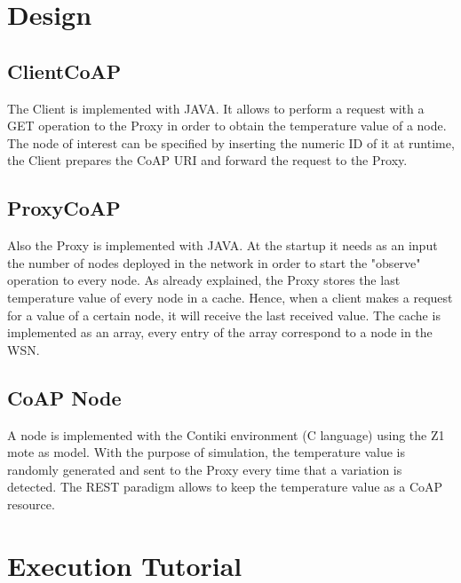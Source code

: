 \documentclass[10pt,english, openany]{book}
\begin{document}
\chapter{Design}
\section{ClientCoAP}
The Client is implemented with JAVA. It allows to perform a request with a GET operation to the Proxy in order to obtain the temperature value of a node. The node of interest can be specified by inserting the numeric ID of it at runtime, the Client prepares the CoAP URI and forward the request to the Proxy.

\section{ProxyCoAP}
Also the Proxy is implemented with JAVA. At the startup it needs as an input the number of nodes deployed in the network in order to start the "observe" operation to every node. 
As already explained, the Proxy stores the last temperature value of every node in a cache. Hence, when a client makes a request for a value of a certain node, it will receive the last received value.
The cache is implemented as an array, every entry of the array correspond to a node in the WSN.

\section{CoAP Node}
A node is implemented with the Contiki environment (C language) using the Z1 mote as model. 
With the purpose of simulation, the temperature value is randomly generated and sent to the Proxy every time that a variation is detected.
The REST paradigm allows to keep the temperature value as a CoAP resource.

\chapter{Execution Tutorial}\label{chapt:doe}
\end{document}
